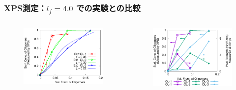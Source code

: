 \documentclass[unicode,12pt]{beamer}%
\begin{document}
\begin{frame}\frametitle{XPS測定：$l_f = 4.0$ での実験との比較}

\begin{columns}
	\begin{column}{6.0cm}
		\vspace{-1\baselineskip}
		\begin{figure}[htbp]
			\begin{center}
				\includegraphics[width=60mm]{XPS_Lf_4_sin_45.eps}
			\end{center}
		\end{figure}
	\end{column}
	\begin{column}{6.0cm}
		\vspace{-0.5\baselineskip}
		\begin{figure}[htbp]
			\begin{center}
				\includegraphics[width=60mm]{Exp_Data_color.eps}

\end{center}
\end{figure}
\end{column}
\end{columns}
\end{frame}
\end{document}
